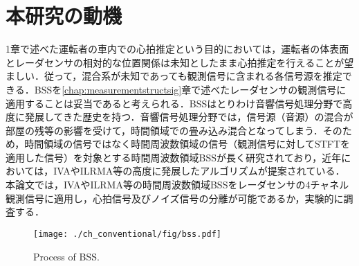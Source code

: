 \section{本研究の動機}
\label{sec:conv:researchmotivation}
{1章で述べた運転者の車内での心拍推定という目的においては，運転者の体表面とレーダセンサの相対的な位置関係は未知としたまま心拍推定を行えることが望ましい．従って，混合系が未知であっても観測信号に含まれる各信号源を推定できる．BSSを\ref{chap:measurementstructsig}章で述べたレーダセンサの観測信号に適用することは妥当であると考えられる．BSSはとりわけ音響信号処理分野で高度に発展してきた歴史を持つ．音響信号処理分野では，信号源（音源）の混合が部屋の残等の影響を受けて，時間領域での畳み込み混合となってしまう．そのため，時間領域の信号ではなく時間周波数領域の信号（観測信号に対してSTFTを適用した信号）を対象とする時間周波数領域BSSが長く研究されており，近年においては，IVAやILRMA等の高度に発展したアルゴリズムが提案されている．本論文では，IVAやILRMA等の時間周波数領域BSSをレーダセンサの4チャネル観測信号に適用し，心拍信号及びノイズ信号の分離が可能であるか，実験的に調査する．}

\begin{figure}[!t]
\centering
\texttt{[image: ./ch\_conventional/fig/bss.pdf]}
\caption{Process of BSS.}
\label{fig:bss}
\end{figure}


